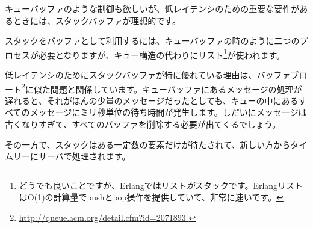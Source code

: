 キューバッファのような制御も欲しいが、低レイテンシのための重要な要件があるときには、スタックバッファが理想的です。

スタックをバッファとして利用するには、キューバッファの時のように二つのプロセスが必要となりますが、キュー構造の代わりにリスト\footnote{どうでも良いことですが、Erlangではリスト\emph{が}スタックです。ErlangリストはO(1)の計算量でpushとpop操作を提供していて、非常に速いです。}が使われます。

低レイテンシのためにスタックバッファが特に優れている理由は、バッファブロート\footnote{\href{http://queue.acm.org/detail.cfm?id=2071893}{http://queue.acm.org/detail.cfm?id=2071893 }}に似た問題と関係しています。キューバッファにあるメッセージの処理が遅れると、それがほんの少量のメッセージだったとしても、キューの中にあるすべてのメッセージにミリ秒単位の待ち時間が発生します。しだいにメッセージは古くなりすぎて、すべてのバッファを削除する必要が出てくるでしょう。


その一方で、スタックはある一定数の要素だけが待たされて、新しい方からタイムリーにサーバで処理されます。%


